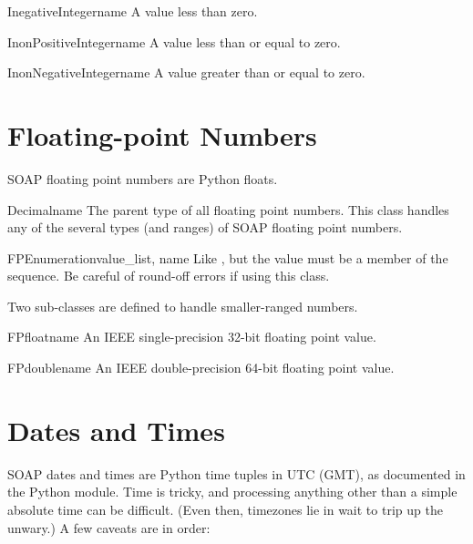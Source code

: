 \begin{classdesc}{InegativeInteger}{name}
A value less than zero.
\end{classdesc}

\begin{classdesc}{InonPositiveInteger}{name}
A value less than or equal to zero.
\end{classdesc}

\begin{classdesc}{InonNegativeInteger}{name}
A value greater than or equal to zero.
\end{classdesc}

\section{Floating-point Numbers}

SOAP floating point numbers are Python floats.

\begin{classdesc}{Decimal}{name}
The parent type of all floating point numbers.
This class handles any of the several types (and ranges) of SOAP
floating point numbers.
\end{classdesc}

\begin{classdesc}{FPEnumeration}{value_list, name}
Like , but the value must be a member of
the  sequence.
Be careful of round-off errors if using this class.
\end{classdesc}

Two sub-classes are defined to handle smaller-ranged numbers.

\begin{classdesc}{FPfloat}{name}
An IEEE single-precision 32-bit floating point value.
\end{classdesc}

\begin{classdesc}{FPdouble}{name}
An IEEE double-precision 64-bit floating point value.
\end{classdesc}

\section{Dates and Times}

SOAP dates and times are Python time tuples in UTC (GMT), as documented
in the Python  module.
Time is tricky, and processing anything other than a simple absolute time
can be difficult.
(Even then, timezones lie in wait to trip up the unwary.)
A few caveats are in order:

